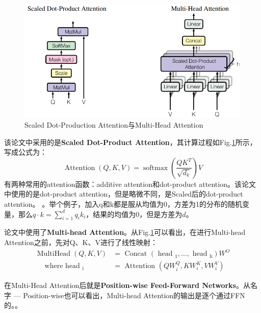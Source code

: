 \begin{figure}[h]
	\centering
	\includegraphics[width=.8\textwidth]{pics/Scaled Dot-Production Attention and Multi-Head Attention.PNG}
	\caption{Scaled Dot-Production Attention与Multi-Head Attention}
	\label{fig:scaled dot-product attention and multi-head attention}
\end{figure}

该论文中采用的是\textbf{Scaled Dot-Product Attention}，其计算过程如Fig.\ref{fig:scaled dot-product attention and multi-head attention}所示，写成公式为：
$$
\operatorname{Attention}(Q, K, V)=\operatorname{softmax}\left(\frac{Q K^{T}}{\sqrt{d_{k}}}\right) V
$$
有两种常用的attention函数：additive attention和dot-product attention。该论文中使用的是dot-product attention，但是略微不同，是Scaled后的dot-product attention。
。举个例子，加入q和k都是服从均值为0，方差为1的分布的随机变量，那么$q \cdot k = \sum_{i=1}^{d} q_i k_i$，结果的均值为0，但是方差为$d$。

论文中使用了\textbf{Multi-head Attention}。从Fig.\ref{fig:scaled dot-product attention and multi-head attention}可以看出，在进行Multi-head Attention之前，先对Q、K、V进行了线性映射：
$$
\begin{aligned}
	\operatorname{MultiHead}(Q, K, V) &=\text { Concat }\left(\text { head }_{1}, \ldots, \text { head }_{\mathrm{h}}\right) W^{O} \\
	\quad \text { where head }_{\mathrm{i}} &=\text { Attention }\left(Q W_{i}^{Q}, K W_{i}^{K}, V W_{i}^{V}\right)
\end{aligned}
$$

在Multi-Head Attention后就是\textbf{Position-wise Feed-Forward Networks}。从名字 --- Position-wise也可以看出，Multi-head Attention的输出是逐个通过FFN的。。


